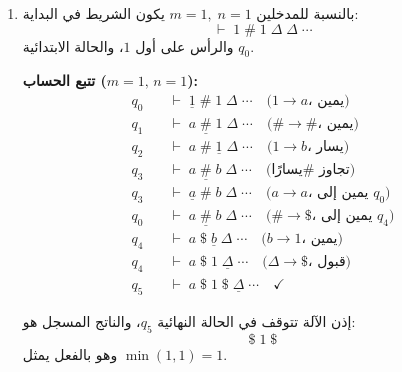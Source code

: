\begin{boxSolution}
\begin{enumerate}[itemsep=1.5em, label=\alph*., resume]
    \item
    بالنسبة للمدخلين $m=1,\;n=1$ يكون الشريط في البداية:
    \[
    \vdash\;1\;\#\;1\;\Delta\;\Delta\;\cdots
    \]
    والرأس على أول $1$، والحالة الابتدائية $q_0$.

    \textbf{تتبع الحساب ($m=1,\, n=1$):}
    \begin{align*}
    q_0 \quad &\vdash\;\underline{1}\;\#\;1\;\Delta\;\cdots
        \quad \text{($1 \to a$، يمين)} \\
    q_1 \quad &\vdash\;a\;\underline{\#}\;1\;\Delta\;\cdots
        \quad \text{($\# \to \#$، يمين)} \\
    q_2 \quad &\vdash\;a\;\#\;\underline{1}\;\Delta\;\cdots
        \quad \text{($1 \to b$، يسار)} \\
    q_3 \quad &\vdash\;a\;\underline{\#}\;b\;\Delta\;\cdots
        \quad \text{(تجاوز \# يسارًا)} \\
    q_3 \quad &\vdash\;\underline{a}\;\#\;b\;\Delta\;\cdots
        \quad \text{($a \to a$، يمين إلى $q_0$)} \\
    q_0 \quad &\vdash\;a\;\underline{\#}\;b\;\Delta\;\cdots
        \quad \text{($\# \to \$$، يمين إلى $q_4$)} \\
    q_4 \quad &\vdash\;a\;\$\;\underline{b}\;\Delta\;\cdots
        \quad \text{($b \to 1$، يمين)} \\
    q_4 \quad &\vdash\;a\;\$\;1\;\underline{\Delta}\;\cdots
        \quad \text{($\Delta \to \$$، قبول)} \\
    q_5 \quad &\vdash\;a\;\$\;1\;\$\;\underline{\Delta}\;\cdots
        \quad \checkmark
    \end{align*}

    إذن الآلة تتوقف في الحالة النهائية $q_5$، والناتج المسجل هو:
    \[
    \$\;1\;\$
    \]
    وهو بالفعل يمثل $\min(1,1)=1$.
\end{enumerate}
\end{boxSolution}

\clearpage
\fi
